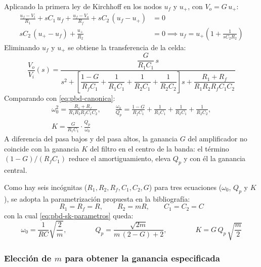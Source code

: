 Aplicando la primera ley de Kirchhoff en los nodos $u_f$ y $u_+$, con $V_o = G\,u_+$:
\begin{align*}
  \frac{u_f - V_i}{R_1} + s C_1\,u_f + \frac{u_f - V_o}{R_f} + s C_2\,(u_f - u_+) &= 0 \\
  s C_2\,(u_+ - u_f) + \frac{u_+}{R_2} &= 0 \implies u_f = u_+ \left( 1 + \frac{1}{s C_2 R_2} \right)
\end{align*}
Eliminando $u_f$ y $u_+$ se obtiene la transferencia de la celda:
\begin{equation}
  \frac{V_o}{V_i}(s) = \frac{\dfrac{G}{R_1 C_1}\,s}{s^2 + \left[ \dfrac{1 - G}{R_f C_1} + \dfrac{1}{R_1 C_1}
    + \dfrac{1}{R_2 C_1} + \dfrac{1}{R_2 C_2} \right] s + \dfrac{R_1 + R_f}{R_1 R_2 R_f C_1 C_2}}
  \label{eq:pbd-sk-h}
\end{equation}
Comparando con \eqref{eq:pbd-canonica}:
\begin{gather}
  \omega_0^2 = \frac{R_1 + R_f}{R_1 R_2 R_f C_1 C_2}, \qquad
  \frac{\omega_0}{Q_p} = \frac{1 - G}{R_f C_1} + \frac{1}{R_1 C_1} + \frac{1}{R_2 C_1} + \frac{1}{R_2 C_2},
  \nonumber \\
  K = \frac{G}{R_1 C_1} \cdot \frac{Q_p}{\omega_0}
  \label{eq:pbd-sk-parametros}
\end{gather}
A diferencia del pasa bajos y del pasa altos, la ganancia $G$ del amplificador no coincide con la ganancia $K$ del
filtro en el centro de la banda: el término $(1 - G)/(R_f C_1)$ reduce el amortiguamiento, eleva $Q_p$ y con él la
ganancia central.

Como hay seis incógnitas ($R_1, R_2, R_f, C_1, C_2, G$) para tres ecuaciones ($\omega_0$, $Q_p$ y $K$), se adopta
la parametrización propuesta en la bibliografía:
\begin{equation}
  R_1 = R_f = R, \qquad R_2 = m R, \qquad C_1 = C_2 = C
\end{equation}
con la cual \eqref{eq:pbd-sk-parametros} queda:
\begin{equation}
  \omega_0 = \frac{1}{R C}\sqrt{\frac{2}{m}}, \qquad\qquad
  Q_p = \frac{\sqrt{2 m}}{m\,(2 - G) + 2}, \qquad\qquad
  K = G\,Q_p\,\sqrt{\frac{m}{2}}
  \label{eq:pbd-sk-prop}
\end{equation}

\subsubsection{Elección de $m$ para obtener la ganancia especificada}

